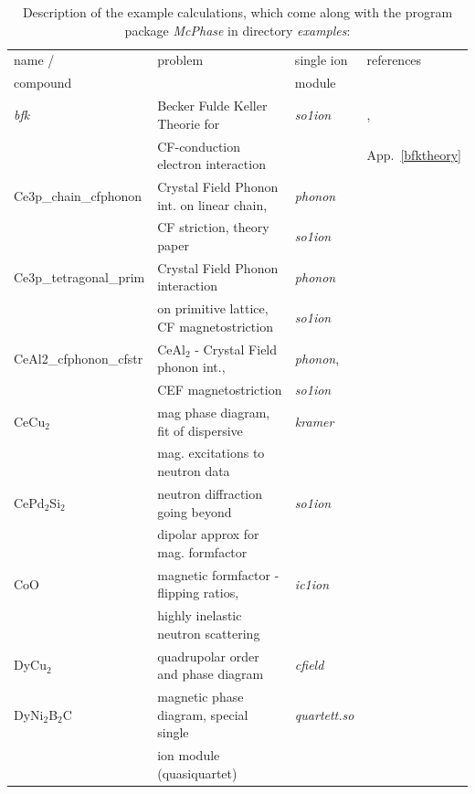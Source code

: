 \documentclass[twoside]{article}
\newcommand{\prg}{\sl}
\begin{document}
\begin{table}[thb] 
\begin{center}  
\caption {Description of the example calculations, which come along with the program package {\prg McPhase} in directory {\prg %
examples}:}   
\label{examples}   
\begin{tabular} 
{l|l|l|l}
name /       & problem & single ion & references \\ 
compound     &          & module  &             \\
\hline
{\prg bfk }    & Becker Fulde Keller Theorie for & {\prg so1ion }\index{bfk} &  \cite{becker77-9}, \\
               &  CF-conduction electron interaction & &  App.~\ref{bfktheory}\\
Ce3p\_chain\_cfphonon & Crystal Field Phonon int. on linear chain, & {\prg phonon } & \\
                      &   CF striction, theory paper & {\prg so1ion } & \\
Ce3p\_tetragonal\_prim & Crystal Field Phonon interaction & {\prg phonon} &  \\
                     &  on primitive lattice, CF magnetostriction & {\prg so1ion } & \\
CeAl2\_cfphonon\_cfstr &  CeAl$_2$ - Crystal Field phonon int., & {\prg phonon}, &  \\
                       &   CEF magnetostriction &   {\prg so1ion } &  \\
CeCu$_2$       & mag phase diagram, fit of dispersive  & {\prg kramer}\index{kramer} & \cite{loewenhaupt06-775,schedler03-1313} \\
               & mag. excitations to neutron data      &               & \\
CePd$_2$Si$_2$ & neutron diffraction going beyond  & {\prg %
so1ion}&\cite{rotter09-140405} \\
               & dipolar approx for mag. formfactor & &\\     
CoO            & magnetic formfactor - flipping ratios,   &{\prg  ic1ion} & \\
               & highly inelastic neutron scattering      &               & \\
DyCu$_2$       & quadrupolar order and phase diagram & {\prg cfield}\index{cfield}&\cite{yoshida98-1421} \\
DyNi$_2$B$_2$C & magnetic phase diagram, special single  & {\prg %
quartett.so}\index{quartett.so}& \\
               & ion module (quasiquartet) &&\\

\end{tabular}
\end{center}
\end{table}
\end{document}
